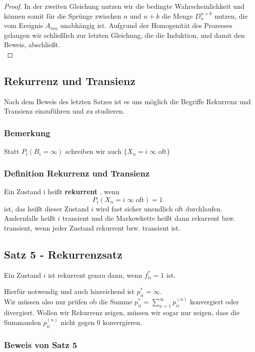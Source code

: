 \documentclass[a4paper]{article}
\begin{document}
\begin{proof}
	In der zweiten Gleichung nutzen wir die bedingte Wahrscheinlichkeit und können somit für die
	Sprünge zwischen $n$ und $n+k$ die Menge $D_n ^{n+k}$ nutzen, die vom Ereignis $A_{mn}$ unabhängig ist.
	Aufgrund der Homogenität des Prozesses gelangen wir schließlich zur letzten Gleichung, die die
	Induktion, und damit den Beweis, abschließt.
	\\

\end{proof}


\subsection{Rekurrenz und Transienz}
Nach dem Beweis des letzten Satzes ist es uns möglich die Begriffe Rekurrenz und Transienz
einzuführen und zu studieren.

\subsubsection{Bemerkung}

Statt $P_i (B_i = \infty)$ schreiben wir auch
$\{
	X_n = i \; \infty \; \text{oft}
\} $

\subsubsection{Definition Rekurrenz und Transienz}
Ein Zustand i heißt \textbf{rekurrent} , wenn 
\[
P_i \left(
	X_n = i \; \infty \; \text{oft}
\right) = 1 
\] 
ist, das heißt dieser Zustand $i$ wird fast
sicher unendlich oft durchlaufen. Andernfalls heißt $i$ transient und die Markowkette heißt dann
rekurrent bzw. transient, wenn jeder Zustand rekurrent bzw. transient ist.

\subsection{Satz 5 - Rekurrenzsatz}
Ein Zustand $i$ ist rekurrent genau dann, wenn $f_{ii}^* = 1$ ist.

Hierfür notwendig und auch hinreichend ist $p_{ii} ^{*} = \infty$.
\\

Wir müssen also nur prüfen ob die Summe 
$p_{ii} ^{*} = \sum_{n=1}^{\infty} p_{ii} ^{(n)}$
konvergiert oder divergiert. Wollen wir Rekurrenz zeigen, müssen wir sogar nur
zeigen, dass die Summanden $p_{ii} ^{(n)}$ nicht gegen $0$ konvergieren.

\subsubsection{Beweis von Satz 5}
\end{document}
